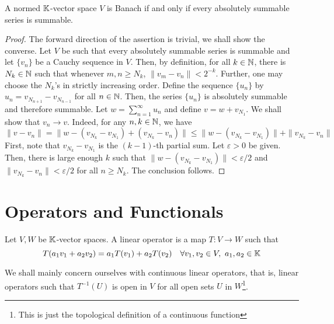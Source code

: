 \begin{theorem}
    A normed $\mathbb K$-vector space $V$ is Banach if and only if every absolutely summable series is summable.
\end{theorem}
\begin{proof}
    The forward direction of the assertion is trivial, we shall show the converse. Let $V$ be such that every absolutely summable series is summable and let $\{v_n\}$ be a Cauchy sequence in $V$. Then, by definition, for all $k\in\mathbb{N}$, there is $N_k\in\mathbb{N}$ such that whenever $m,n\ge N_k$, $\|v_m - v_n\| < 2^{-k}$. Further, one may choose the $N_k$'s in strictly increasing order. Define the sequence $\{u_n\}$ by $u_n = v_{N_{n + 1}} - v_{N_{n - 1}}$ for all $n\in\mathbb{N}$. Then, the series $\{u_n\}$ is absolutely summable and therefore summable. Let $w = \sum_{n = 1}^\infty u_n$ and define $v = w + v_{N_1}$. We shall show that $v_n\to v$. Indeed, for any $n,k\in\mathbb{N}$, we have 
    \begin{equation*}
        \|v - v_n\| = \|w - (v_{N_k} - v_{N_1}) + (v_{N_k} - v_n)\|\le\|w - (v_{N_k} - v_{N_1})\| + \|v_{N_k} - v_n\|
    \end{equation*}
    First, note that $v_{N_k} - v_{N_1}$ is the $(k - 1)$-th partial sum. Let $\varepsilon > 0$ be given. Then, there is large enough $k$ such that $\|w - (v_{N_k} - v_{N_1})\| < \varepsilon/2$ and $\|v_{N_k} - v_n\| < \varepsilon/2$ for all $n\ge N_k$. The conclusion follows.
\end{proof}

\section{Operators and Functionals}

\begin{definition}
    Let $V, W$ be $\mathbb K$-vector spaces. A linear operator is a map $T: V\to W$ such that 
    \begin{equation*}
        T(a_1v_1 + a_2v_2) = a_1T(v_1) + a_2T(v_2)\quad\forall v_1,v_2\in V,~a_1,a_2\in\mathbb K
    \end{equation*}
\end{definition}

We shall mainly concern ourselves with continuous linear operators, that is, linear operators such that $T^{-1}(U)$ is open in $V$ for all open sets $U$ in $W$\footnote{This is just the topological definition of a continuous function}.


